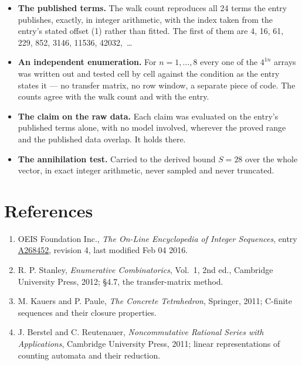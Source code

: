 \documentclass[11pt]{article}
\theoremstyle{definition}
\begin{document}
\begin{itemize}

\item {\bfseries The published terms.} The walk count reproduces all 24 terms the entry publishes, exactly, in integer arithmetic, with the index taken from the entry's stated offset (1) rather than fitted. The first of them are 4, 16, 61, 229, 852, 3146, 11536, 42032,~\dots

\item {\bfseries An independent enumeration.} For $n = 1,\dots,8$ every one of the $4^{1n}$ arrays was written out and tested cell by cell against the condition as the entry states it --- no transfer matrix, no row window, a separate piece of code. The counts agree with the walk count and with the entry.

\item {\bfseries The claim on the raw data.} Each claim was evaluated on the entry's published terms alone, with no model involved, wherever the proved range and the published data overlap. It holds there.

\item {\bfseries The annihilation test.} Carried to the derived bound $S = 28$ over the whole vector, in exact integer arithmetic, never sampled and never truncated.

\end{itemize}

\section{References}

\begin{enumerate}

\item OEIS Foundation Inc., \emph{The On-Line Encyclopedia of Integer Sequences}, entry \href{https://oeis.org/A268452}{A268452}, revision 4, last modified Feb 04 2016.

\item R. P. Stanley, \emph{Enumerative Combinatorics}, Vol.~1, 2nd ed., Cambridge University Press, 2012; \S4.7, the transfer-matrix method.

\item M. Kauers and P. Paule, \emph{The Concrete Tetrahedron}, Springer, 2011; C-finite sequences and their closure properties.

\item J. Berstel and C. Reutenauer, \emph{Noncommutative Rational Series with Applications}, Cambridge University Press, 2011; linear representations of counting automata and their reduction.

\end{enumerate}
\end{document}
